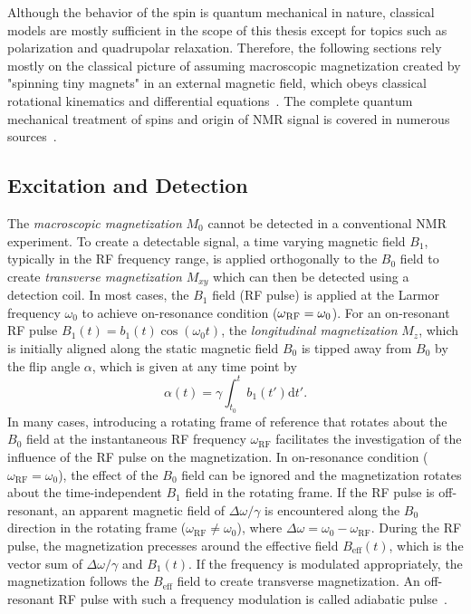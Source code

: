 Although the behavior of the spin is quantum mechanical in nature, classical models are mostly sufficient in the scope of this thesis except for topics such as polarization and quadrupolar relaxation. Therefore, the following sections rely mostly on the classical picture of assuming macroscopic magnetization created by "spinning tiny magnets" in an external magnetic field, which obeys classical rotational kinematics and differential equations~\cite{hansonQuantumMechanicsNecessary2008}. The complete quantum mechanical treatment of spins and origin of \gls{NMR} signal is covered in numerous sources~\cite{levittSpinDynamicsBasics,haackeMagneticResonanceImaging1999}. 

\subsection{Excitation and Detection}
The \emph{macroscopic magnetization} $M_0$ cannot be detected in a conventional \gls{NMR} experiment. To create a detectable signal, a time varying magnetic field $B_1$, typically in the \gls{RF} frequency range, is applied orthogonally to the $B_0$ field to create \emph{transverse magnetization} $M_{xy}$ which can then be detected using a detection coil. 
In most cases, the $B_1$ field (\gls{RF} pulse) is applied at the Larmor frequency $\omega_0$ to achieve on-resonance condition ($\omega\textsubscript{RF}=\omega_0$). For an on-resonant \gls{RF} pulse $B_1(t)= b_1(t)\cos(\omega_0 t)$, the \emph{longitudinal magnetization} $M_z$, which is initially aligned along the static magnetic field $B_0$ is tipped away from $B_0$ by the flip angle $\alpha$, which is given at any time point by
\begin{equation}
	\alpha(t)=\gamma\int_{t_0}^{t} b_1(t')\text{d}t' .
\end{equation}
In many cases, introducing a rotating frame of reference that rotates about the $B_0$ field at the instantaneous RF frequency $\omega_\text{RF}$ facilitates the investigation of the influence of the \gls{RF} pulse on the magnetization. In on-resonance condition ($\omega_\text{RF}=\omega_0$), the effect of the $B_0$ field can be ignored and the magnetization rotates about the time-independent $B_1$ field in the rotating frame. If the \gls{RF} pulse is off-resonant, an apparent magnetic field of $\Delta\omega/\gamma$ is encountered along the $B_0$ direction in the rotating frame ($\omega_\text{RF}\neq\omega_0$), where $\Delta\omega=\omega_0-\omega_\text{RF}$. During the \gls{RF} pulse, the magnetization precesses around the effective field $B_\text{eff}(t)$, which is the vector sum of  $\Delta\omega/\gamma$ and $B_1(t)$. If the frequency is modulated appropriately, the magnetization follows the $B_\text{eff}$ field to create transverse magnetization. An off-resonant \gls{RF} pulse with such a frequency modulation is called adiabatic pulse~\cite{tannusAdiabaticPulses1997}. 

